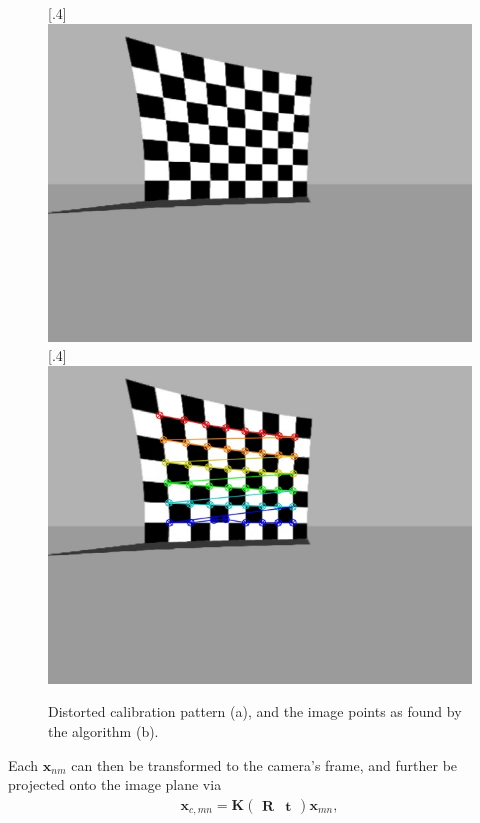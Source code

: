 \begin{figure}[h]
	\centering
	\subcaptionbox{}%
	[.4\linewidth]{\includegraphics[scale=.2]{chapters/03_background/img/gazebo_calib_left.jpg}}
	\subcaptionbox{}%
	[.4\linewidth]{\includegraphics[scale=.2]{chapters/03_background/img/gazebo_corners.jpg}}
	\caption{Distorted calibration pattern (a), and the image points as found by the algorithm (b).}
	\label{fig::324_distortion}
\end{figure} 
Each $\bm{x}_{nm}$ can then be transformed to the camera's frame, and further be projected onto the image plane via
\begin{align}
	\bm{x}_{c,mn} = \bm{K}\begin{pmatrix}
	\bm{R} & \bm{t}
	\end{pmatrix}\bm{x}_{mn},
\end{align}
